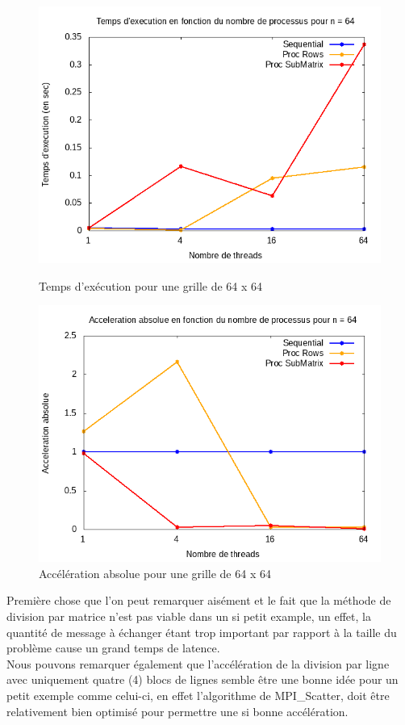 \documentclass[10pt,a4paper]{article}
\begin{document}
\newpage
\begin{figure}[!]
  \centering
  \begin{minipage}[b]{0.49\textwidth}
	\includegraphics[width=\textwidth]{./Time/size_64_time.png}
    \caption{Temps d'exécution pour une grille de 64 x 64}
  \end{minipage}
  \hfill
  \begin{minipage}[b]{0.49\textwidth}
    \includegraphics[width=\textwidth]{./Time/size_64_acceleration.png}
    \caption{Accélération absolue pour une grille de 64 x 64}
  \end{minipage}
\end{figure}

Première chose que l'on peut remarquer aisément et le fait que la méthode de division par matrice n'est pas viable dans un si petit example, un effet, la quantité de message à échanger étant trop important par rapport à la taille du problème cause un grand temps de latence.\\
Nous pouvons remarquer également que l'accélération de la division par ligne avec uniquement quatre (4) blocs de lignes semble être une bonne idée pour un petit exemple comme celui-ci, en effet l'algorithme de MPI\_Scatter, doit être relativement bien optimisé pour permettre une si bonne accélération.
\end{document}
